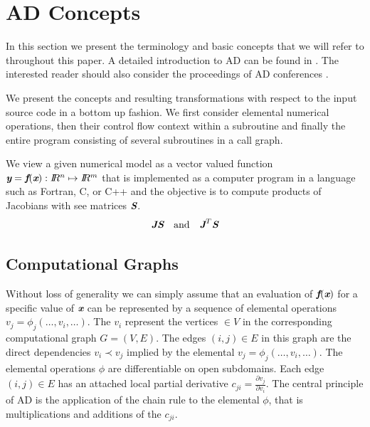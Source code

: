 \documentclass{book}
\newcommand{\R}{I\!\!R}
\newcommand{\bmf}{\mbox{\bf\em f}}
\newcommand{\bmJ}{\mbox{\bf\em J}}
\newcommand{\bmS}{\mbox{\bf\em S}}
\newcommand{\bmx}{\mbox{\bf\em x}}
\newcommand{\bmy}{\mbox{\bf\em y}}
\begin{document}
\chapter{AD Concepts}\label{sec:ADIntro}

In this section we present the terminology and basic concepts that 
we will refer to throughout this paper. 
A detailed introduction to AD can be found in \cite{Griewank2008EDP}.
The interested reader should also consider the proceedings of AD 
conferences \cite{Griewank1991ADo,Berz1996CDT,Corliss2002ADo,Bucker2005ADA,Bischof2008AiA}.

We present the concepts and resulting transformations 
with respect to the input source code 
in a bottom up fashion.  
We first consider elemental numerical operations, 
then their control flow context within a subroutine and finally the entire program 
consisting of several subroutines in a call graph. 

We view a given numerical model as a 
vector valued function $\bmy=\bmf(\bmx): \R^n\mapsto \R^m$ that is implemented 
as a computer program in a language such as Fortran, C, or C++ and the objective is to  
compute products of Jacobians with see matrices $\bmS$.
\begin{equation}\label{eqn:JacVecProds}
\bmJ \bmS \quad \mbox{and} \quad \bmJ^T \bmS
\end{equation}
\section{Computational Graphs} \label{sec:computationalGraphs}

Without loss of generality we can simply assume that an evaluation of $\bmf(\bmx)$ for  
a specific value of $\bmx$ can be represented by a sequence of 
elemental operations $v_j=\phi_j(\ldots,v_i,\ldots)$. 
The $v_i$ represent the vertices $\in V$ in the corresponding computational 
graph $G=(V,E)$. The edges $(i,j)\in E$ in this graph are the direct dependencies 
$v_i\prec v_j$ implied by the elemental $v_j=\phi_j(\ldots,v_i,\ldots)$.
The elemental operations $\phi$ are differentiable on open subdomains. 
Each edge $(i,j)\in E$ has an attached local partial derivative 
$c_{ji}=\frac{\partial v_j}{\partial v_i}$. 
The central principle of AD is 
the application of the chain rule to the elemental $\phi$, that is 
multiplications and additions of the  $c_{ji}$.  
\end{document}
